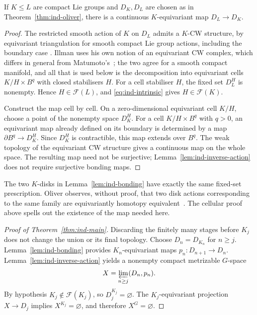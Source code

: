 \begin{lemma}\label{lem:ind-bonding}
If $K\le L$ are compact Lie groups and $D_K,D_L$ are chosen as in
Theorem~\ref{thm:ind-oliver}, there is a continuous $K$-equivariant map
$D_L\to D_K$.
\end{lemma}

\begin{proof}
The restricted smooth action of $K$ on $D_L$ admits a $K$-CW
structure, by equivariant triangulation for smooth compact Lie group
actions, including the boundary case
\cite[Section~7, especially Theorem~7.1 and Corollary~7.2]{Illman1983}.
Illman uses his own notion of an equivariant CW complex, which differs in
general from Matumoto's~\cite[Remark~6.2]{Illman1983}; the two agree for a
smooth compact manifold, and all that is used below is the decomposition
into equivariant cells $K/H\times B^q$ with closed stabilisers $H$.
For a cell stabiliser $H$, the fixed set $D_L^H$ is nonempty. Hence
$H\in\mathcal F(L)$, and \eqref{eq:ind-intrinsic} gives $H\in\mathcal F(K)$.

Construct the map cell by cell. On a zero-dimensional equivariant
cell $K/H$, choose a point of the nonempty space $D_K^H$.
For a cell $K/H\times B^q$ with $q>0$, an equivariant map already
defined on its boundary is determined by a map
$\partial B^q\to D_K^H$. Since $D_K^H$ is contractible, this map
extends over $B^q$. The weak topology of the equivariant CW structure
gives a continuous map on the whole space. The resulting map need not
be surjective; Lemma~\ref{lem:ind-inverse-action} does not require
surjective bonding maps.
\end{proof}

\begin{remark}\label{rem:ind-remark-2}
The two $K$-disks in Lemma~\ref{lem:ind-bonding} have exactly the same
fixed-set prescription. Oliver observes, without proof, that two
disk actions corresponding to the same family are equivariantly homotopy
equivalent~\cite[p.~96]{Oliver1976}. The cellular proof above spells out the
existence of the map needed here.
\end{remark}

\begin{proof}[Proof of Theorem~\ref{thm:ind-main}]
Discarding the finitely many stages before $K_j$ does not change the
union or its final topology. Choose $D_n=D_{K_n}$ for $n\ge j$.
Lemma~\ref{lem:ind-bonding} provides $K_n$-equivariant maps
$p_n:D_{n+1}\to D_n$. Lemma~\ref{lem:ind-inverse-action} yields a
nonempty compact metrizable $G$-space
\[
X=\varprojlim_{n\ge j}(D_n,p_n).
\]
By hypothesis $K_j\notin\mathcal F(K_j)$, so
$D_j^{K_j}=\varnothing$. The $K_j$-equivariant projection $X\to D_j$
implies $X^{K_j}=\varnothing$, and therefore $X^G=\varnothing$.
\end{proof}

